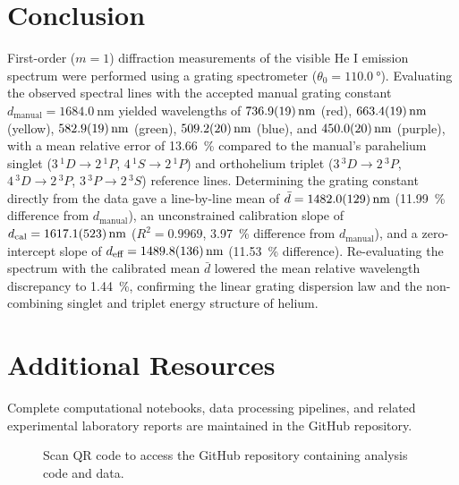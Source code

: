 \documentclass[journal]{IEEEtran}
\begin{document}
\section{Conclusion}
First-order ($m = 1$) diffraction measurements of the visible He I emission spectrum were performed using a grating spectrometer ($\theta_0 = \SI{110.0}{\degree}$). Evaluating the observed spectral lines with the accepted manual grating constant $d_{\text{manual}} = \SI{1684.0}{\nano\meter}$ yielded wavelengths of $\SI{736.9 \pm 1.9}{\nano\meter}$ (red), $\SI{663.4 \pm 1.9}{\nano\meter}$ (yellow), $\SI{582.9 \pm 1.9}{\nano\meter}$ (green), $\SI{509.2 \pm 2.0}{\nano\meter}$ (blue), and $\SI{450.0 \pm 2.0}{\nano\meter}$ (purple), with a mean relative error of \SI{13.66}{\percent} compared to the manual's parahelium singlet ($3\,^{1}D \rightarrow 2\,^{1}P$, $4\,^{1}S \rightarrow 2\,^{1}P$) and orthohelium triplet ($3\,^{3}D \rightarrow 2\,^{3}P$, $4\,^{3}D \rightarrow 2\,^{3}P$, $3\,^{3}P \rightarrow 2\,^{3}S$) reference lines. Determining the grating constant directly from the data gave a line-by-line mean of $\bar{d} = \SI{1482.0 \pm 12.9}{\nano\meter}$ (\SI{11.99}{\percent} difference from $d_{\text{manual}}$), an unconstrained calibration slope of $d_{\text{cal}} = \SI{1617.1 \pm 52.3}{\nano\meter}$ ($R^2 = 0.9969$, \SI{3.97}{\percent} difference from $d_{\text{manual}}$), and a zero-intercept slope of $d_{\text{eff}} = \SI{1489.8 \pm 13.6}{\nano\meter}$ (\SI{11.53}{\percent} difference). Re-evaluating the spectrum with the calibrated mean $\bar{d}$ lowered the mean relative wavelength discrepancy to \SI{1.44}{\percent}, confirming the linear grating dispersion law and the non-combining singlet and triplet energy structure of helium.

\section{Additional Resources}
Complete computational notebooks, data processing pipelines, and related experimental laboratory reports are maintained in the GitHub repository.

\begin{figure}[H]
    \centering
    \begin{minipage}{0.15\textwidth}
        \centering
    \end{minipage}%
    \begin{minipage}{0.2\textwidth}
        \raggedright
        \caption{Scan QR code to access the GitHub repository containing analysis code and data.}
        \label{fig:qr_code}
    \end{minipage}
\end{figure}
\end{document}
